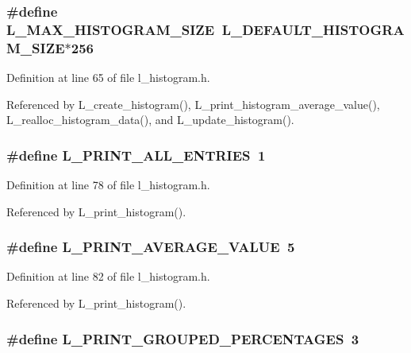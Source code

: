 \subsubsection{\setlength{\rightskip}{0pt plus 5cm}\#define L\_\-MAX\_\-HISTOGRAM\_\-SIZE~L\_\-DEFAULT\_\-HISTOGRAM\_\-SIZE$\ast$256}\label{l__histogram_8h_106b5ac81970fcc64427aec11a5cd9fd}




Definition at line 65 of file l\_\-histogram.h.

Referenced by L\_\-create\_\-histogram(), L\_\-print\_\-histogram\_\-average\_\-value(), L\_\-realloc\_\-histogram\_\-data(), and L\_\-update\_\-histogram().
\subsubsection{\setlength{\rightskip}{0pt plus 5cm}\#define L\_\-PRINT\_\-ALL\_\-ENTRIES~1}\label{l__histogram_8h_62d79e5ea4df5c5c0381eb452c85c82c}




Definition at line 78 of file l\_\-histogram.h.

Referenced by L\_\-print\_\-histogram().
\subsubsection{\setlength{\rightskip}{0pt plus 5cm}\#define L\_\-PRINT\_\-AVERAGE\_\-VALUE~5}\label{l__histogram_8h_1e8184a472fc7438d4b4f2d4c2f3168b}




Definition at line 82 of file l\_\-histogram.h.

Referenced by L\_\-print\_\-histogram().
\subsubsection{\setlength{\rightskip}{0pt plus 5cm}\#define L\_\-PRINT\_\-GROUPED\_\-PERCENTAGES~3}\label{l__histogram_8h_db78e89c1c57ba351f95416be7fe8f55}




